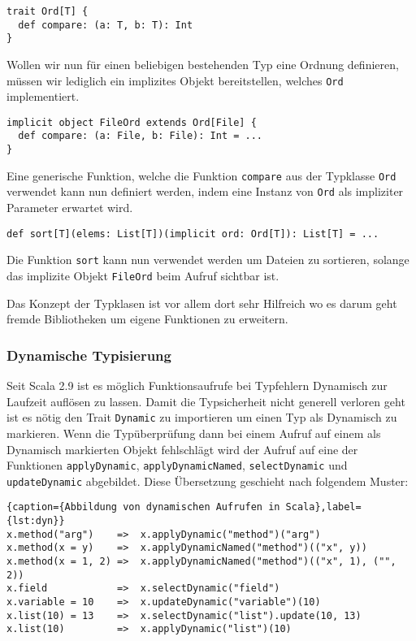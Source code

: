 \begin{lstlisting}
trait Ord[T] {
  def compare: (a: T, b: T): Int
}
\end{lstlisting}

Wollen wir nun für einen beliebigen bestehenden Typ eine Ordnung definieren, müssen wir lediglich
ein implizites Objekt bereitstellen, welches \texttt{Ord} implementiert.

\begin{lstlisting}
implicit object FileOrd extends Ord[File] {
  def compare: (a: File, b: File): Int = ...
}
\end{lstlisting}

Eine generische Funktion, welche die Funktion \texttt{compare} aus der Typklasse \texttt{Ord}
verwendet kann nun definiert werden, indem eine Instanz von \texttt{Ord} als impliziter Parameter
erwartet wird.

\begin{lstlisting}
def sort[T](elems: List[T])(implicit ord: Ord[T]): List[T] = ...
\end{lstlisting}

Die Funktion \texttt{sort} kann nun verwendet werden um Dateien zu sortieren, solange das implizite Objekt
\texttt{FileOrd} beim Aufruf sichtbar ist.

Das Konzept der Typklasen ist vor allem dort sehr Hilfreich wo es darum geht fremde  Bibliotheken um
eigene Funktionen zu erweitern.

\subsubsection{Dynamische Typisierung}
\label{sec:dyn}

Seit Scala 2.9 ist es möglich Funktionsaufrufe bei Typfehlern Dynamisch zur  Laufzeit auflösen zu
lassen. Damit die Typsicherheit nicht generell verloren  geht ist es nötig den Trait
\texttt{Dynamic} zu importieren um einen Typ als  Dynamisch zu markieren. Wenn die Typüberprüfung
dann bei einem Aufruf auf einem als Dynamisch markierten Objekt fehlschlägt wird der Aufruf auf eine
der Funktionen \texttt{applyDynamic}, \texttt{applyDynamicNamed}, \texttt{selectDynamic} und
\texttt{updateDynamic}  abgebildet. Diese Übersetzung geschieht nach folgendem Muster:

\begin{lstlisting}{caption={Abbildung von dynamischen Aufrufen in Scala},label={lst:dyn}}
x.method("arg")    =>  x.applyDynamic("method")("arg")
x.method(x = y)    =>  x.applyDynamicNamed("method")(("x", y))
x.method(x = 1, 2) =>  x.applyDynamicNamed("method")(("x", 1), ("", 2))
x.field            =>  x.selectDynamic("field")
x.variable = 10    =>  x.updateDynamic("variable")(10)
x.list(10) = 13    =>  x.selectDynamic("list").update(10, 13)
x.list(10)         =>  x.applyDynamic("list")(10)
\end{lstlisting}
 
